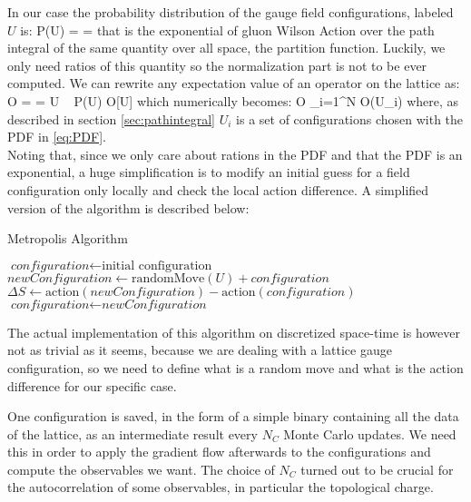 In our case the probability distribution of the gauge field configurations, labeled $U$ is:
\beq
\label{eq:PDF}
    P(U) =  = 
\eeq
that is the exponential of gluon Wilson Action over the path integral of the same quantity over all space, the partition function. Luckily, we only need ratios of this quantity so the normalization part is not to be ever computed. We can rewrite any expectation value of an operator on the lattice as:
\beq
    \langle O \rangle =  = \int  \D U ~ P(U) O[U]
\eeq
which numerically becomes:
\beq
\langle O \rangle \approx {} \sum_{i=1}^N O(U_i)
\eeq
where, as described in section \cref{sec:pathintegral} $U_i$ is a set of configurations chosen with the PDF in \cref{eq:PDF}. \\
Noting that, since we only care about rations in the PDF and that the PDF is an exponential, a huge simplification is to modify an initial guess for a field configuration only locally and check the local action difference.
A simplified version of the algorithm is described below:
\begin{algorithm} 
    \caption{Metropolis Algorithm}\label{metropolis:algo}
    \begin{algorithmic}[1]
    \State $\textit{configuration} \gets \text{initial configuration}$
            \State $\textit{newConfiguration}  \gets \text{randomMove}(U) + \textit{configuration}$  
            \State $\Delta S \gets \text{action} (\textit{newConfiguration}) - \text{action} (\textit{configuration})$
                \State $\textit{configuration} \gets \textit{newConfiguration}$
            \EndIf
        \EndFor
    \EndFor
    \end{algorithmic}  
\end{algorithm} 

The actual implementation of this algorithm on discretized space-time is however not as trivial as it seems, because we are dealing with a lattice gauge configuration, so we need to define what is a random move and what is the action difference for our specific case.
 
One configuration is saved, in the form of a simple binary containing all the data of the lattice, as an intermediate result every $N_C$ Monte Carlo updates. We need this in order to apply the gradient flow afterwards to the configurations and compute the observables we want. The choice of $N_C$ turned out to be crucial for the autocorrelation of some observables, in particular the topological charge.

